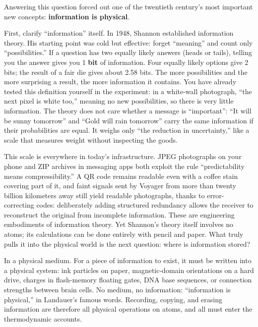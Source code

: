 
Answering this question forced out one of the twentieth century's most important new concepts: \textbf{information is physical}.

First, clarify ``information'' itself. In 1948, Shannon established information theory. His starting point was cold but effective: forget ``meaning'' and count only ``possibilities.'' If a question has two equally likely answers (heads or tails), telling you the answer gives you 1 \textbf{bit} of information. Four equally likely options give 2 bits; the result of a fair die gives about 2.58 bits. The more possibilities and the more surprising a result, the more information it contains. You have already tested this definition yourself in the experiment: in a white-wall photograph, ``the next pixel is white too,'' meaning no new possibilities, so there is very little information. The theory does not care whether a message is ``important'': ``It will be sunny tomorrow'' and ``Gold will rain tomorrow'' carry the same information if their probabilities are equal. It weighs only ``the reduction in uncertainty,'' like a scale that measures weight without inspecting the goods.

This scale is everywhere in today's infrastructure. JPEG photographs on your phone and ZIP archives in messaging apps both exploit the rule ``predictability means compressibility.'' A QR code remains readable even with a coffee stain covering part of it, and faint signals sent by Voyager from more than twenty billion kilometers away still yield readable photographs, thanks to error-correcting codes: deliberately adding structured redundancy allows the receiver to reconstruct the original from incomplete information. These are engineering embodiments of information theory. Yet Shannon's theory itself involves no atoms; its calculations can be done entirely with pencil and paper. What truly pulls it into the physical world is the next question: where is information stored?

In a physical medium. For a piece of information to exist, it must be written into a physical system: ink particles on paper, magnetic-domain orientations on a hard drive, charges in flash-memory floating gates, DNA base sequences, or connection strengths between brain cells. No medium, no information: ``information is physical,'' in Landauer's famous words. Recording, copying, and erasing information are therefore all physical operations on atoms, and all must enter the thermodynamic accounts.

